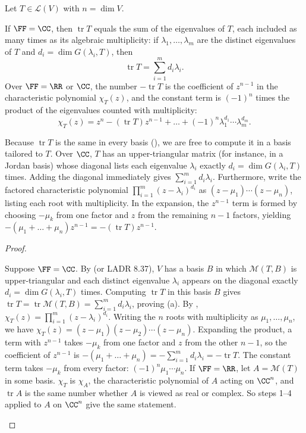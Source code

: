 \documentclass[10pt]{scrartcl}
\DeclareMathOperator{\tr}{tr}\DeclareMathOperator{\nul}{null}\DeclareMathOperator{\range}{range}\DeclareMathOperator{\spn}{span}
\newcommand{\LL}{\mathcal L}\newcommand{\PP}{\mathcal P}\newcommand{\MM}{\mathcal M}
\begin{document}
\begin{proposition*}
  Let $T\in\LL(V)$ with $n=\dim V$.
  \begin{enumerate}[(a)]
    \ii If $\FF=\CC$, then $\tr T$ equals the sum of the eigenvalues of $T$, each included as many times as its algebraic multiplicity: if $\lambda_1,\dots,\lambda_m$ are the distinct eigenvalues of $T$ and $d_i=\dim G(\lambda_i,T)$, then
    \[
      \tr T = \sum_{i=1}^m d_i\lambda_i.
    \]
    \ii Over $\FF=\RR$ or $\CC$, the number $-\tr T$ is the coefficient of $z^{n-1}$ in the characteristic polynomial $\chi_T(z)$, and the constant term is $(-1)^n$ times the product of the eigenvalues counted with multiplicity:
    \[
      \chi_T(z) = z^n - (\tr T)z^{n-1} + \dots + (-1)^n\lambda_1^{d_1}\cdots\lambda_m^{d_m}.
    \]
  \end{enumerate}
\end{proposition*}
\begin{ideabox}
  Because $\tr T$ is the same in every basis (), we are free to compute it in a basis tailored to $T$. Over $\CC$, $T$ has an upper-triangular matrix (for instance, in a Jordan basis) whose diagonal lists each eigenvalue $\lambda_i$ exactly $d_i=\dim G(\lambda_i,T)$ times. Adding the diagonal immediately gives $\sum_{i=1}^m d_i\lambda_i$. Furthermore, write the factored characteristic polynomial $\prod_{i=1}^m (z-\lambda_i)^{d_i}$ as $(z-\mu_1)\cdots(z-\mu_n)$, listing each root with multiplicity. In the expansion, the $z^{n-1}$ term is formed by choosing $-\mu_k$ from one factor and $z$ from the remaining $n-1$ factors, yielding $-(\mu_1+\dots+\mu_n)z^{n-1}=-(\tr T)z^{n-1}$.
\end{ideabox}
\begin{proof}
  \begin{steps}
    \ii Suppose $\FF=\CC$. By  (or LADR 8.37), $V$ has a basis $B$ in which $\MM(T,B)$ is upper-triangular and each distinct eigenvalue $\lambda_i$ appears on the diagonal exactly $d_i=\dim G(\lambda_i,T)$ times.
    \ii Computing $\tr T$ in this basis $B$ gives $\tr T = \tr\MM(T,B) = \sum_{i=1}^m d_i\lambda_i$, proving (a).
    \ii By , $\chi_T(z)=\prod_{i=1}^m(z-\lambda_i)^{d_i}$. Writing the $n$ roots with multiplicity as $\mu_1,\dots,\mu_n$, we have $\chi_T(z)=(z-\mu_1)(z-\mu_2)\cdots(z-\mu_n)$.
    \ii Expanding the product, a term with $z^{n-1}$ takes $-\mu_k$ from one factor and $z$ from the other $n-1$, so the coefficient of $z^{n-1}$ is $-(\mu_1+\dots+\mu_n)=-\sum_{i=1}^m d_i\lambda_i=-\tr T$. The constant term takes $-\mu_k$ from every factor: $(-1)^n\mu_1\cdots\mu_n$.
    \ii If $\FF=\RR$, let $A=\MM(T)$ in some basis. $\chi_T$ is $\chi_A$, the characteristic polynomial of $A$ acting on $\CC^n$, and $\tr A$ is the same number whether $A$ is viewed as real or complex. So steps 1--4 applied to $A$ on $\CC^n$ give the same statement.
  \end{steps}
\end{proof}
\end{document}
